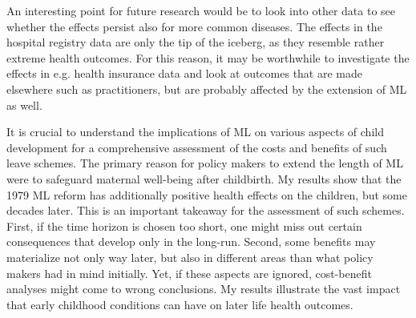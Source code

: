 \documentclass[11pt, a4paper]{article} %
\begin{document}
An interesting point for future research would be to look into other data to see whether the effects persist also for more common diseases. The effects in the hospital registry data are only the tip of the iceberg, as they resemble rather extreme health outcomes. For this reason, it may be worthwhile to investigate the effects in e.g. health insurance data and look at outcomes that are made elsewhere such as practitioners, but are probably affected by the extension of ML as well. \newline


It is crucial to understand the implications of ML on various aspects of child development for a comprehensive assessment of the costs and benefits of such leave schemes. The primary reason for policy makers to extend the length of ML were to safeguard maternal well-being after childbirth. My results show that the 1979 ML reform has additionally positive health effects on the children, but some decades later. This is an important takeaway for the assessment of such schemes. First, if the time horizon is chosen too short, one might miss out certain consequences that develop only in the long-run. Second, some benefits may materialize not only way later, but also in different areas than what policy makers had in mind initially. Yet, if these aspects are ignored, cost-benefit analyses might come to wrong conclusions. My results illustrate the vast impact that early childhood conditions can have on later life health outcomes. 


 
 

 
 

 





\newpage



\end{document}
